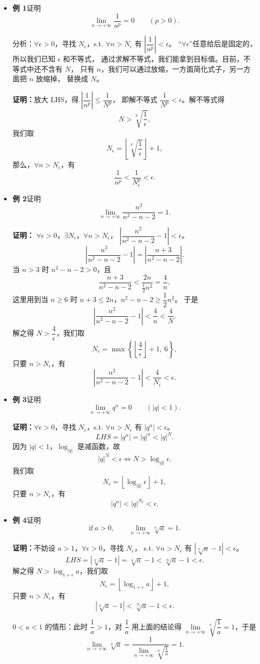 \documentclass[UTF8,11pt]{ctexart}
\theoremstyle{cnthm}
\begin{document}
\begin{itemize}
\item \textbf{例 1}\quad 证明
\[
\lim_{n\to+\infty}\frac{1}{n^p}=0\qquad(p>0).
\]

分析：$\forall\epsilon>0$，寻找 $N_\epsilon$，s.t.
$\forall n>N_\epsilon$ 有 $\left|\dfrac{1}{n^p}\right|<\epsilon$。
“$\forall\epsilon$”任意给后是固定的，所以我们已知 $\epsilon$ 和不等式，
通过求解不等式，我们能拿到目标值。目前，不等式中还不含有 $N$，
只有 $n$，我们可以通过放缩，一方面简化式子，另一方面把 $n$ 放缩掉，
替换成 $N$。

\textbf{证明：}\quad 放大 LHS，得
$\left|\dfrac{1}{n^p}\right|\leq\dfrac{1}{N^p}$，
即解不等式 $\dfrac{1}{N^p}<\epsilon$。解不等式得
\[
N>\sqrt[p]{\frac1\epsilon},
\]
我们取
\[
N_\epsilon=\left\lfloor\sqrt[p]{\frac1\epsilon}\right\rfloor+1,
\]
那么，$\forall n>N_\epsilon$，有
\[
\frac{1}{n^p}<\frac{1}{N_\epsilon^p}<\epsilon .
\]

\item \textbf{例 2}\quad 证明
\[
\lim_{n\to+\infty}\frac{n^2}{n^2-n-2}=1 .
\]

\textbf{证明：}\quad
$\forall\epsilon>0$，$\exists N_\epsilon$，$\forall n>N_\epsilon$，
$\left|\dfrac{n^2}{n^2-n-2}-1\right|<\epsilon$。
\[
\left|\frac{n^2}{n^2-n-2}-1\right|
=\left|\frac{n+3}{n^2-n-2}\right| .
\]
当 $n>3$ 时 $n^2-n-2>0$，且
\[
\frac{n+3}{n^2-n-2}<\frac{2n}{\frac12 n^2}=\frac4n,
\]
这里用到当 $n\geq6$ 时 $n+3\leq2n$，$n^2-n-2\geq\dfrac12n^2$。
于是
\[
\left|\frac{n^2}{n^2-n-2}-1\right|<\frac4n<\frac4N .
\]
解之得 $N>\dfrac4\epsilon$，我们取
\[
N_\epsilon=\max\left\{\left\lfloor\frac4\epsilon\right\rfloor+1,\ 6\right\},
\]
只要 $n>N_\epsilon$，有
\[
\left|\frac{n^2}{n^2-n-2}-1\right|<\frac{4}{N_\epsilon}<\epsilon .
\]

\item \textbf{例 3}\quad 证明
\[
\lim_{n\to+\infty}q^n=0\qquad(|q|<1).
\]

\textbf{证明：}\quad $\forall\epsilon>0$，寻找 $N_\epsilon$，s.t.
$\forall n>N_\epsilon$ 有 $|q^n|<\epsilon$。
\[
LHS=|q^n|=|q|^n<|q|^N .
\]
因为 $|q|<1$，$\log_{|q|}$ 是减函数，故
\[
|q|^N<\epsilon\iff N>\log_{|q|}\epsilon .
\]
我们取
\[
N_\epsilon=\left\lfloor\log_{|q|}\epsilon\right\rfloor+1,
\]
只要 $n>N_\epsilon$，有
\[
|q^n|<|q|^{N_\epsilon}<\epsilon .
\]

\item \textbf{例 4}\quad 证明
\[
\text{if}\ a>0,\qquad \lim_{n\to+\infty}\sqrt[n]{a}=1 .
\]

\textbf{证明：}\quad 不妨设 $a>1$，$\forall\epsilon>0$，寻找 $N_\epsilon$，
s.t. $\forall n>N_\epsilon$ 有 $\left|\sqrt[n]{a}-1\right|<\epsilon$。
\[
LHS=\left|\sqrt[n]{a}-1\right|
=\sqrt[n]{a}-1<\sqrt[N]{a}-1<\epsilon .
\]
解之得 $N>\log_{1+\epsilon}a$，我们取
\[
N_\epsilon=\left\lfloor\log_{1+\epsilon}a\right\rfloor+1,
\]
只要 $n>N_\epsilon$，有
\[
\left|\sqrt[n]{a}-1\right|<\sqrt[N_\epsilon]{a}-1<\epsilon .
\]

$0<a<1$ 的情形：此时 $\dfrac1a>1$，对 $\dfrac1a$ 用上面的结论得
$\lim\limits_{n\to+\infty}\sqrt[n]{\dfrac1a}=1$，于是
\[
\lim_{n\to+\infty}\sqrt[n]{a}
=\frac{1}{\lim\limits_{n\to+\infty}\sqrt[n]{\frac1a}}=1 .
\]
\end{itemize}
\end{document}
